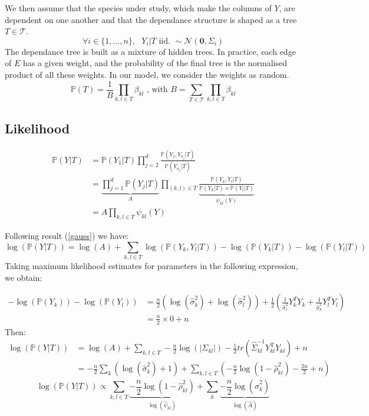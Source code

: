 \documentclass[a4paper,11pt]{article}
\begin{document}
  We then assume that the species under study, which make the columns of $Y$, are dependent on one another and that the dependance structure
  is shaped as a tree $T\in\mathcal{T}$.\\
  \[\forall i\in\{1,...,n\},\text{  }Y_i|T \text{ iid. } \sim \mathcal{N}(\mathbf{0},\Sigma_i)\]
  The dependance tree is built as a mixture of hidden trees. In practice, each edge of $E$ has a given weight, and the probability of the final
  tree is the normalised product of all these weights. In our model, we consider the weights as random.
  \[ \mathds{P}(T) = \frac{1}{B}\prod_{k,l\in T} \beta_{kl} \text{ , with } B = \sum_{T\in\mathcal{T}} \prod_{k,l\in T} \beta_{kl} \]
  
  \subsection{Likelihood}
  
 
\begin{align*}
\mathds{P}(Y|T) &=\mathds{P}(Y_1|T)\prod_{j=2}^d \frac{\mathds{P}(Y_j,Y_{a_j}|T)}{\mathds{P}(Y_{a_j}|T)}\\
&=\underbrace{\prod_{j=1}^d \mathds{P}(Y_j|T)}_{\text{$A$}}\prod_{(k,l)\in T} \underbrace{\frac{\mathds{P}(Y_k,Y_l|T)}{\mathds{P}(Y_k|T)\times \mathds{P}(Y_l|T)}}_{\psi_{kl}(Y)}\\
&=A\prod_{k,l \in T}\psi_{kl}(Y)
\end{align*}

  Following result (\ref{gauss}) we have:
  \[
   \log(\mathds{P}(Y|T)) = \log(A)+\sum_{k,l\in T} \log(\mathds{P}(Y_k,Y_l|T))-\log(\mathds{P}(Y_k|T))-\log(\mathds{P}(Y_l|T))
\]
   Taking maximum likelihood estimates for parameters in the following expression, we obtain:
   
    \begin{align*}
    -\log(\mathds{P}(Y_k))-\log(\mathds{P}(Y_l)) &=\frac{n}{2} (\log(\hat{\sigma}_k^2)+\log(\hat{\sigma}_l^2))+\frac{1}{2}\left( \frac{1}{\hat{\sigma}_l^2} Y_k^TY_k + \frac{1}{\hat{\sigma}_k^2} Y_l^TY_l \right)\\
    &=\frac{n}{2}\times 0 +n
    \end{align*}
    Then:
     \begin{align*}
    \log(\mathds{P}(Y|T))&= \log(A)+\sum_{k,l\in T} -\frac{n}{2} \log (|\Sigma_{kl}|) - \frac{1}{2}tr(\hat{\Sigma}_{kl}^{-1} Y_{kl}^{\text{T}}Y_{kl})+n\\
    &= -\frac{n}{2}\sum_k (\log(\hat{\sigma}_k^2)+1)  +\sum_{k,l\in T}\left( -\frac{n}{2} \log (1-\hat{\rho}_{kl}^2) - \frac{2n}{2}+n\right)
     \end{align*}
    \[ \boxed{\log(\mathds{P}(Y|T))   \propto \sum_{k,l\in T}\underbrace{-\frac{n}{2}\log (1-\hat{\rho}_{kl}^2)}_{\log(\hat{\psi}_{kl})}+\sum_k\underbrace{-\frac{n}{2} \log(\hat{\sigma}_k^2)}_{\log(\hat{A})}}\]
\end{document}
